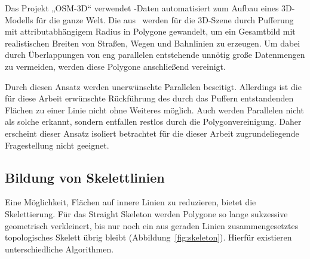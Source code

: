 \documentclass[../main/thesis.tex]{subfiles}
\begin{document}
Das Projekt „OSM-3D“ verwendet \osm-Daten automatisiert zum Aufbau eines 3D-Modells für die ganze Welt.
Die  aus \osm\ werden für die 3D-Szene durch Pufferung mit attributabhängigem Radius in Polygone gewandelt, um ein Gesamtbild mit realistischen Breiten von Straßen, Wegen und Bahnlinien zu erzeugen.
Um dabei durch Überlappungen von eng parallelen  entstehende unnötig große Datenmengen zu vermeiden, werden diese Polygone anschließend vereinigt. 

Durch diesen Ansatz werden unerwünschte Parallelen beseitigt.
Allerdings ist die für diese Arbeit erwünschte Rückführung des durch das Puffern entstandenden Flächen zu einer Linie nicht ohne Weiteres möglich.
Auch werden Parallelen nicht als solche erkannt, sondern entfallen restlos durch die Polygonvereinigung.
Daher erscheint dieser Ansatz isoliert betrachtet für die dieser Arbeit zugrundeliegende Fragestellung nicht geeignet.


\subsection{Bildung von Skelettlinien}
\label{ch:skeleton}

Eine Möglichkeit, Flächen auf innere Linien zu reduzieren, bietet die Skelettierung.
Für das Straight Skeleton werden Polygone so lange sukzessive geometrisch verkleinert, bis nur noch ein aus geraden Linien zusammengesetztes topologisches Skelett übrig bleibt (Abbildung~\ref{fig:skeleton}).
Hierfür existieren unterschiedliche Algorithmen. 


\end{document}
